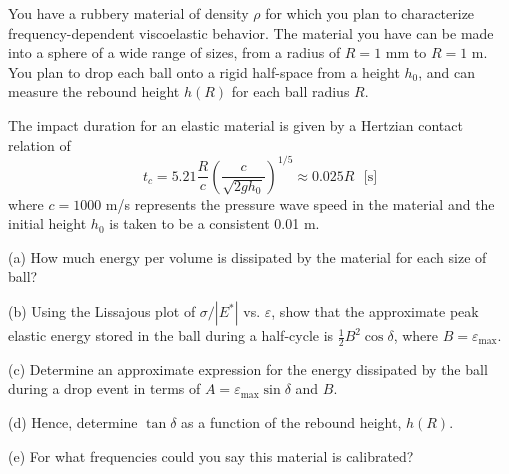 You have a rubbery material of density $\rho$ for which you plan to characterize frequency-dependent viscoelastic behavior. 
The material you have can be made into a sphere of a wide range of sizes, from a radius of $R=1$ mm to $R=1$ m. 
You plan to drop each ball onto a rigid half-space from a height $h_0$, and can measure the rebound height $h(R)$ for each ball radius $R$. 

The impact duration for an elastic material is given by a Hertzian contact relation of
\begin{equation*}
    t_c = 5.21\frac{R}{c}\left(\frac{c}{\sqrt{2 g h_0}}\right)^{1/5} \approx 0.025R  \textrm{~~[s]}
\end{equation*}
where $c = 1000$ m/s represents the pressure wave speed in the material and the initial height $h_0$ is taken to be a consistent 0.01 m.

(a) How much energy per volume is dissipated by the material for each size of ball? 

(b) Using the Lissajous plot of $\sigma/|E^*|$ vs. $\varepsilon$, show that the approximate peak elastic energy stored in the ball during a half-cycle is $\frac{1}{2} B^2 \cos \delta$, where $B = \varepsilon_{\textrm{max}}$. 

(c) Determine an approximate expression for the energy dissipated by the ball during a drop event in terms of $A = \varepsilon_{\textrm{max}} \sin \delta$ and $B$. 

(d) Hence, determine $\tan\delta$ as a function of the rebound height, $h(R)$. 

(e) For what frequencies could you say this material is calibrated?